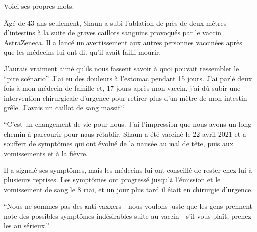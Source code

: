 Voici ses propres mots:

Âgé de 43 ans seulement, Shaun a subi l'ablation de près de deux mètres
d'intestins à la suite de graves caillots sanguins provoqués par le vaccin
AstraZeneca. Il a lancé un avertissement aux autres personnes vaccinées après
que les médecins lui ont dit qu'il avait failli mourir.

J'aurais vraiment aimé qu'ils nous fassent savoir à quoi pouvait ressembler le
“pire scénario”. J'ai eu des douleurs à l'estomac pendant 15 jours. J'ai parlé
deux fois à mon médecin de famille et, 17 jours après mon vaccin, j'ai dû subir
une intervention chirurgicale d'urgence pour retirer plus d'un mètre de mon
intestin grêle. J'avais un caillot de sang massif.“

“C'est un changement de vie pour nous. J'ai l'impression que nous avons un long
chemin à parcourir pour nous rétablir. Shaun a été vacciné le 22 avril 2021 et a
souffert de symptômes qui ont évolué de la nausée au mal de tête, puis aux
vomissements et à la fièvre.

Il a signalé ses symptômes, mais les médecins lui ont conseillé de rester chez
lui à plusieurs reprises. Les symptômes ont progressé jusqu'à l'émission et le
vomissement de sang le 8 mai, et un jour plus tard il était en chirurgie
d'urgence.

“Nous ne sommes pas des anti-vaxxers - nous voulons juste que les gens prennent
note des possibles symptômes indésirables suite au vaccin - s'il vous plaît,
prenez-les au sérieux.”


